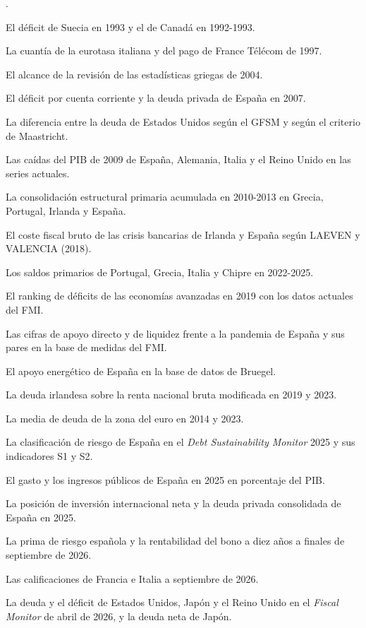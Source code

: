 \documentclass[10pt,a4paper]{article}
\newcounter{numitem}
\newenvironment{lnum}
      {\begin{list}{\arabic{numitem}.}{%
          \usecounter{numitem}%
          \setlength{\leftmargin}{1cm}%
          \setlength{\parskip}{3pt}%
          \setlength{\itemsep}{0pt}%
          \setlength{\parsep}{0pt}%
      }}
      {\end{list}}
\begin{document}
\begin{lnum}
    \item El déficit de Suecia en 1993 y el de Canadá en 1992-1993.
    \item La cuantía de la eurotasa italiana y del pago de France Télécom de 1997.
    \item El alcance de la revisión de las estadísticas griegas de 2004.
    \item El déficit por cuenta corriente y la deuda privada de España en 2007.
    \item La diferencia entre la deuda de Estados Unidos según el GFSM y según el criterio de Maastricht.
    \item Las caídas del PIB de 2009 de España, Alemania, Italia y el Reino Unido en las series actuales.
    \item La consolidación estructural primaria acumulada en 2010-2013 en Grecia, Portugal, Irlanda y España.
    \item El coste fiscal bruto de las crisis bancarias de Irlanda y España según LAEVEN y VALENCIA (2018).
    \item Los saldos primarios de Portugal, Grecia, Italia y Chipre en 2022-2025.
    \item El ranking de déficits de las economías avanzadas en 2019 con los datos actuales del FMI.
    \item Las cifras de apoyo directo y de liquidez frente a la pandemia de España y sus pares en la base de medidas del FMI.
    \item El apoyo energético de España en la base de datos de Bruegel.
    \item La deuda irlandesa sobre la renta nacional bruta modificada en 2019 y 2023.
    \item La media de deuda de la zona del euro en 2014 y 2023.
    \item La clasificación de riesgo de España en el \textit{Debt Sustainability Monitor} 2025 y sus indicadores S1 y S2.
    \item El gasto y los ingresos públicos de España en 2025 en porcentaje del PIB.
    \item La posición de inversión internacional neta y la deuda privada consolidada de España en 2025.
    \item La prima de riesgo española y la rentabilidad del bono a diez años a finales de septiembre de 2026.
    \item Las calificaciones de Francia e Italia a septiembre de 2026.
    \item La deuda y el déficit de Estados Unidos, Japón y el Reino Unido en el \textit{Fiscal Monitor} de abril de 2026, y la deuda neta de Japón.

\end{lnum}
\end{document}
